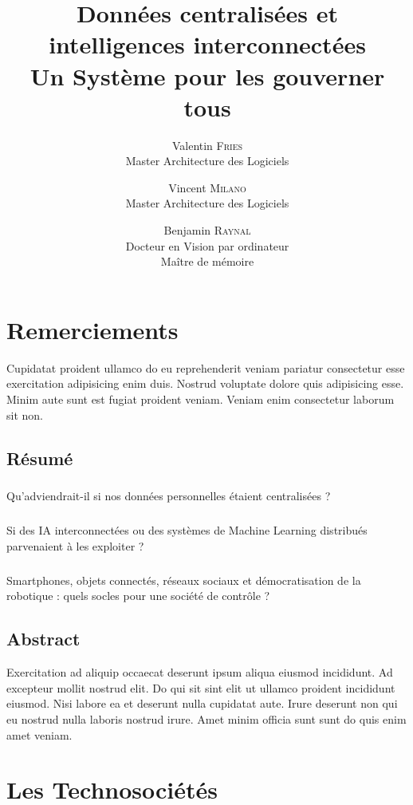 \documentclass{report}
\title{
    \huge Données centralisées et intelligences interconnectées \\
    \LARGE Un Système pour les gouverner tous
}
\author{
    Valentin \textsc{Fries} \\ Master Architecture des Logiciels 
    \and
    Vincent \textsc{Milano} \\ Master Architecture des Logiciels
    \and
    Benjamin \textsc{Raynal} \\ Docteur en Vision par ordinateur \\ Maître de mémoire
}
\begin{document}
\maketitle

\newpage
\chapter*{Remerciements}
Cupidatat proident ullamco do eu reprehenderit veniam pariatur consectetur esse exercitation adipisicing enim duis. Nostrud voluptate dolore quis adipisicing esse. Minim aute sunt est fugiat proident veniam. Veniam enim consectetur laborum sit non.

\newpage
\section*{Résumé}
    \paragraph{} Qu'adviendrait-il si nos données personnelles étaient centralisées ?
    \paragraph{} Si des IA interconnectées ou des systèmes de Machine Learning distribués parvenaient à les exploiter ?
    \paragraph{} Smartphones, objets connectés, réseaux sociaux et démocratisation de la robotique : quels socles pour une société de contrôle ?

\newpage
\section*{Abstract}
Exercitation ad aliquip occaecat deserunt ipsum aliqua eiusmod incididunt. Ad excepteur mollit nostrud elit. Do qui sit sint elit ut ullamco proident incididunt eiusmod. Nisi labore ea et deserunt nulla cupidatat aute. Irure deserunt non qui eu nostrud nulla laboris nostrud irure. Amet minim officia sunt sunt do quis enim amet veniam.

\newpage
\tableofcontents

\newpage
{}

\chapter{Les Technosociétés}
\end{document}
